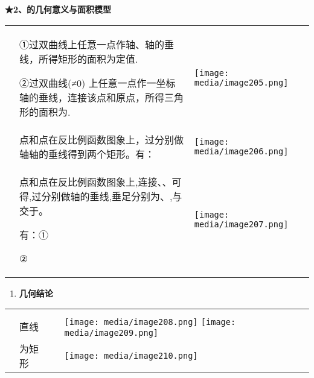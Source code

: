 \documentclass[a4paper,11pt,UTF8]{ctexart}
\begin{document}
\textbf{★2、的几何意义与面积模型}

\begin{longtable}[]{@{}lll@{}}
\toprule
\endhead
\begin{minipage}[t]{0.30\columnwidth}\raggedright
\strut
\end{minipage} & \begin{minipage}[t]{0.30\columnwidth}\raggedright
①过双曲线上任意一点作轴、轴的垂线，所得矩形的面积为定值.

②过双曲线(≠0)
上任意一点作一坐标轴的垂线，连接该点和原点，所得三角形的面积为.\strut
\end{minipage} & \begin{minipage}[t]{0.30\columnwidth}\raggedright
\texttt{[image: media/image205.png]}\strut
\end{minipage}\tabularnewline
& 点和点在反比例函数图象上，过分别做轴轴的垂线得到两个矩形。有： &
\texttt{[image: media/image206.png]}\tabularnewline
\begin{minipage}[t]{0.30\columnwidth}\raggedright
\strut
\end{minipage} & \begin{minipage}[t]{0.30\columnwidth}\raggedright
点和点在反比例函数图象上,连接、、可得,过分别做轴的垂线,垂足分别为、,与交于。

有：①

②\strut
\end{minipage} & \begin{minipage}[t]{0.30\columnwidth}\raggedright
\texttt{[image: media/image207.png]}\strut
\end{minipage}\tabularnewline
\bottomrule
\end{longtable}

\begin{enumerate}
\def\labelenumi{\arabic{enumi}.}
\setcounter{enumi}{2}
\item
  \textbf{几何结论}
\end{enumerate}

\begin{longtable}[]{@{}llll@{}}
\toprule
\endhead
& & &\tabularnewline
& 直线 & &
\texttt{[image: media/image208.png]}
\texttt{[image: media/image209.png]}\tabularnewline
& 为矩形 & &
\texttt{[image: media/image210.png]}\tabularnewline
\bottomrule
\end{longtable}
\end{document}
